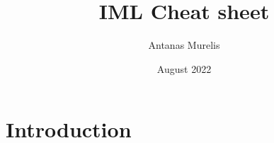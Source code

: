 \documentclass{article}
\title{IML Cheat sheet}
\author{Antanas Murelis}
\date{August 2022}
\begin{document}
\maketitle

\section{Introduction}
\end{document}
